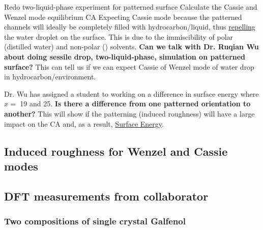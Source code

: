 \begin{outline}[enumerate]
\1 Redo two-liquid-phase experiment for patterned surface
	\2 Calculate the Cassie and Wenzel mode equilibrium CA
		\3 Expecting Cassie mode because the patterned channels will ideally be completely filled with hydrocarbon/\nalk liquid, thus \underline{repelling} the water droplet on the surface. This is due to the immiscibility of polar (distilled water) and non-polar (\nalk) solvents. 
			\4 \textbf{Can we talk with Dr. Ruqian Wu about doing sessile drop, two-liquid-phase, simulation on patterned surface?} This can tell us if we can expect Cassie of Wenzel mode of water drop in hydrocarbon/\nalk environment. 
			
			\4 Dr. Wu has assigned a student to working on a difference in \fegacomp surface energy where $x =$ 19 and 25.
	\2 \textbf{Is there a difference from one patterned orientation to another?}
		\3 This will show if the patterning (induced roughness) will have a large impact on the CA and, as a result, \underline{Surface Energy}. 
\end{outline}

\subsection{Induced roughness for Wenzel and Cassie modes}

\subsection{DFT measurements from collaborator}
\subsubsection{Two compositions of single crystal Galfenol}
